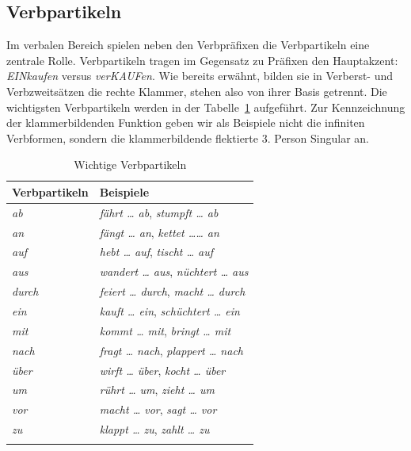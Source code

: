 \subsection{Verbpartikeln}\label{subsection:VPartikeln}

Im verbalen Bereich spielen neben den Verbpräfixen die Verbpartikeln eine zentrale Rolle. Verbpartikeln tragen im Gegensatz zu Präfixen den Hauptakzent: \textit{EINkaufen} versus \textit{verKAUFen}. Wie bereits erwähnt, bilden sie in Verberst- und Verbzweitsätzen die rechte Klammer, stehen also von ihrer Basis getrennt. Die wichtigsten Verbpartikeln werden in der Tabelle~\ref{tab:Verbpartikeln} aufgeführt. Zur Kennzeichnung der klammerbildenden Funktion geben wir als Beispiele nicht die infiniten Verbformen, sondern die klammerbildende flektierte 3. Person Singular an.

\begin{table}[!htbp]
  \centering
  \begin{tabular}{l l}
    \lsptoprule
    Verbpartikeln & Beispiele \\
    \hline
    \textit{ab} & \textit{fährt \ldots{} ab}, \textit{stumpft \ldots{} ab}\\
    
    \textit{an} & \textit{fängt \ldots{} an}, \textit{kettet \ldots{}\ldots{} an}\\
    
    \textit{auf} & \textit{hebt \ldots{} auf}, \textit{tischt \ldots{} auf}\\

    \textit{aus} & \textit{wandert \ldots{} aus}, \textit{nüchtert \ldots{} aus}\\

    \textit{durch} & \textit{feiert \ldots{} durch}, \textit{macht \ldots{} durch}\\ 
    
    \textit{ein} & \textit{kauft \ldots{} ein}, \textit{schüchtert \ldots{} ein}\\
    
    \textit{mit} & \textit{kommt \ldots{} mit}, \textit{bringt \ldots{} mit}\\ 
    
    \textit{nach} & \textit{fragt \ldots{} nach}, \textit{plappert \ldots{} nach}\\ 

    \textit{über} & \textit{wirft \ldots{} über}, \textit{kocht \ldots{} über}\\ 

    \textit{um} & \textit{rührt \ldots{} um}, \textit{zieht \ldots{} um}\\ 

    \textit{vor} & \textit{macht \ldots{} vor}, \textit{sagt \ldots{} vor}\\
    
    \textit{zu} & \textit{klappt \ldots{} zu}, \textit{zahlt \ldots{} zu}\\
    
    \lspbottomrule 
  \end{tabular}
  \caption{Wichtige Verbpartikeln}
  \label{tab:Verbpartikeln}
\end{table}


